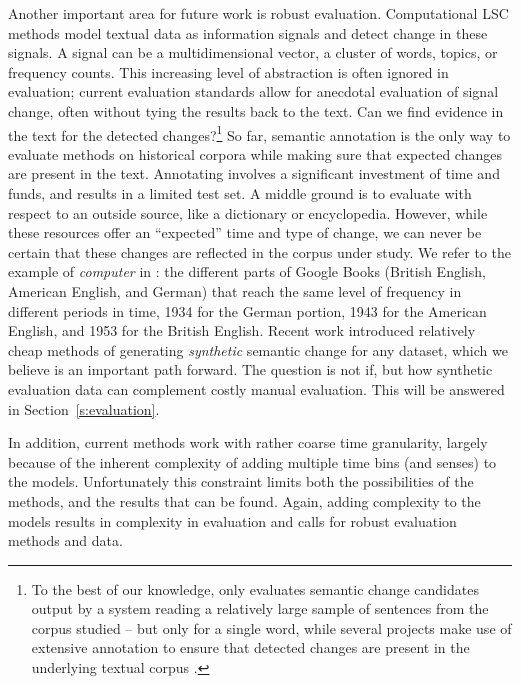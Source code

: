 \documentclass[output=paper]{langscibook}
\begin{document}
Another important area for future work is robust evaluation. Computational LSC methods model textual data as information signals and detect change in these signals. A signal can be a multidimensional vector, a cluster of words, topics, or frequency counts. 
This increasing level of abstraction is often ignored in evaluation; current evaluation standards allow for anecdotal evaluation of signal change, often without tying the results back to the text. Can we find evidence in the text for the detected changes?\footnote{To the best of our knowledge, only \citet{hengchen2017does} evaluates semantic change candidates output by a system reading a relatively large sample of sentences from the corpus studied -- but only for a single word, while several projects make use of extensive annotation to ensure that detected changes are present in the underlying textual corpus \citep{lau-etal-2012-word,schlechtweg-etal-2017-german,schlechtweg2018durel,schlechtweg-etal-2020-semeval,haettysurel:2019,perrone-etal-2019-gasc,giulianelli-etal-2020-analysing}.}
So far, semantic annotation is the only way to evaluate methods on historical corpora while making sure that expected changes are present in the text. Annotating involves a significant investment of time and funds, and results in a limited test set.
A middle ground is to evaluate with respect to an outside source, like a dictionary or encyclopedia. However, while these resources offer an ``expected'' time and type of change, we can never be certain that these changes are reflected in the corpus under study. We refer to the example of \textit{computer} in \citet{tahmasebi2018survey}: the different parts of Google Books (British English, American English, and German) that reach the same level of frequency in different periods in time,  1934 for the German portion, 1943 for the American English, and 1953 for the British English. 
Recent work \citep{kulkarni2015statistically,dubossarsky-etal-2019-time,shoemark-etal-2019-room,schlechtwegwalde20} introduced relatively cheap methods of generating \emph{synthetic} semantic change for any dataset, which we believe is an important path forward. The question is not if, but how synthetic evaluation data can complement costly manual evaluation. This will be answered in Section~\ref{s:evaluation}.

In addition, current methods work with rather coarse time granularity, largely because of the inherent complexity of adding multiple time bins (and senses) to the models. Unfortunately this constraint limits both the possibilities of the methods, and the results that can be found. Again, adding complexity to the models results in complexity in evaluation and calls for robust evaluation methods and data.  
\end{document}
